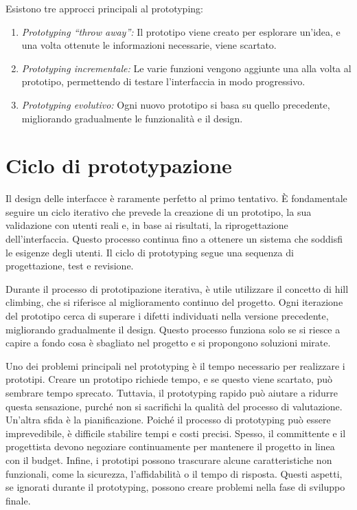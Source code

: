 Esistono tre approcci principali al prototyping:
\begin{enumerate}
    \item \textit{Prototyping “throw away”:} Il prototipo viene creato per esplorare un'idea, e una volta ottenute le informazioni necessarie, viene scartato.
    \item \textit{Prototyping incrementale:} Le varie funzioni vengono aggiunte una alla volta al prototipo, permettendo di testare l'interfaccia in modo progressivo.
    \item \textit{Prototyping evolutivo:} Ogni nuovo prototipo si basa su quello precedente, migliorando gradualmente le funzionalità e il design.
\end{enumerate}

\section{Ciclo di prototypazione}
Il design delle interfacce è raramente perfetto al primo tentativo. È fondamentale seguire un ciclo iterativo che prevede la creazione di un prototipo, la sua validazione con utenti reali e, in base ai risultati, la riprogettazione dell'interfaccia. Questo processo continua fino a ottenere un sistema che soddisfi le esigenze degli utenti. Il ciclo di prototyping segue una sequenza di progettazione, test e revisione.

Durante il processo di prototipazione iterativa, è utile utilizzare il concetto di hill climbing, che si riferisce al miglioramento continuo del progetto. Ogni iterazione del prototipo cerca di superare i difetti individuati nella versione precedente, migliorando gradualmente il design. Questo processo funziona solo se si riesce a capire a fondo cosa è sbagliato nel progetto e si propongono soluzioni mirate.

Uno dei problemi principali nel prototyping è il tempo necessario per realizzare i prototipi. Creare un prototipo richiede tempo, e se questo viene scartato, può sembrare tempo sprecato. Tuttavia, il prototyping rapido può aiutare a ridurre questa sensazione, purché non si sacrifichi la qualità del processo di valutazione.
Un'altra sfida è la pianificazione. Poiché il processo di prototyping può essere imprevedibile, è difficile stabilire tempi e costi precisi. Spesso, il committente e il progettista devono negoziare continuamente per mantenere il progetto in linea con il budget.
Infine, i prototipi possono trascurare alcune caratteristiche non funzionali, come la sicurezza, l'affidabilità o il tempo di risposta. Questi aspetti, se ignorati durante il prototyping, possono creare problemi nella fase di sviluppo finale.

